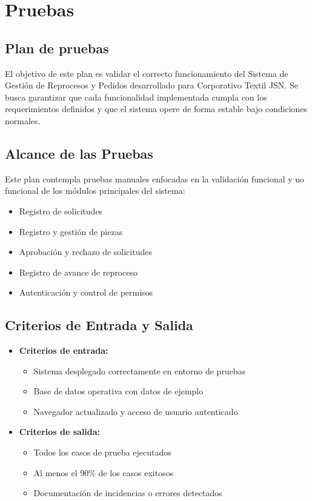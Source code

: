 \documentclass[12pt,letterpaper,spanish]{report}
\begin{document}
\section{Pruebas}

\subsection{Plan de pruebas}
El objetivo de este plan es validar el correcto funcionamiento del Sistema de Gesti\'on de Reprocesos y Pedidos desarrollado para Corporativo Textil JSN. Se busca garantizar que cada funcionalidad implementada cumpla con los requerimientos definidos y que el sistema opere de forma estable bajo condiciones normales.

\subsection{Alcance de las Pruebas}
Este plan contempla pruebas manuales enfocadas en la validaci\'on funcional y no funcional de los m\'odulos principales del sistema:

\begin{itemize}
    \item Registro de solicitudes
    \item Registro y gesti\'on de piezas
    \item Aprobaci\'on y rechazo de solicitudes
    \item Registro de avance de reproceso
    \item Autenticaci\'on y control de permisos
\end{itemize}


\subsection{Criterios de Entrada y Salida}
\begin{itemize}
    \item \textbf{Criterios de entrada:}
    \begin{itemize}
        \item Sistema desplegado correctamente en entorno de pruebas
        \item Base de datos operativa con datos de ejemplo
        \item Navegador actualizado y acceso de usuario autenticado
    \end{itemize}

    \item \textbf{Criterios de salida:}
    \begin{itemize}
        \item Todos los casos de prueba ejecutados
        \item Al menos el 90\% de los casos exitosos
        \item Documentaci\'on de incidencias o errores detectados
    \end{itemize}
\end{itemize}
\end{document}
